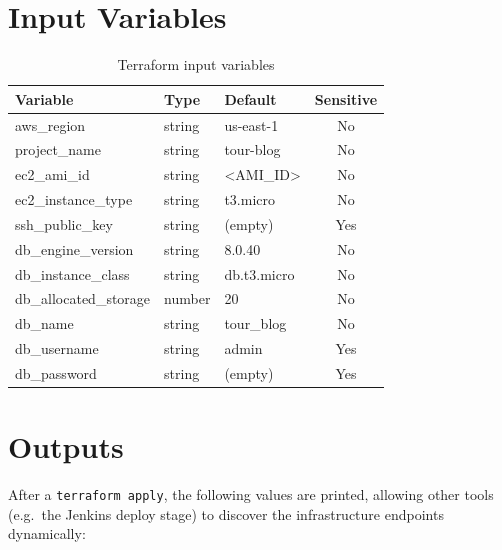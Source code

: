 \documentclass[12pt,a4paper]{report}
\begin{document}
\section{Input Variables}

\begin{table}[H]
  \centering
  \caption{Terraform input variables}
  \begin{tabular}{lllc}
    \toprule
    \textbf{Variable} & \textbf{Type} & \textbf{Default} & \textbf{Sensitive} \\
    \midrule
    aws\_region          & string & us-east-1        & No \\
    project\_name        & string & tour-blog        & No \\
    ec2\_ami\_id         & string & <AMI_ID> & No \\
    ec2\_instance\_type  & string & t3.micro         & No \\
    ssh\_public\_key     & string & (empty)          & Yes \\
    db\_engine\_version  & string & 8.0.40           & No \\
    db\_instance\_class  & string & db.t3.micro      & No \\
    db\_allocated\_storage & number & 20             & No \\
    db\_name             & string & tour\_blog       & No \\
    db\_username         & string & admin            & Yes \\
    db\_password         & string & (empty)          & Yes \\
    \bottomrule
  \end{tabular}
\end{table}

\section{Outputs}

After a \texttt{terraform apply}, the following values are printed, allowing other tools (e.g.\ the Jenkins deploy stage) to discover the infrastructure endpoints dynamically:
\end{document}
